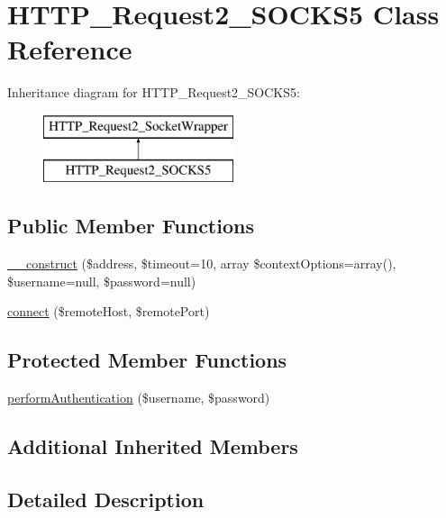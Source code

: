 \hypertarget{classHTTP__Request2__SOCKS5}{}\section{H\+T\+T\+P\+\_\+\+Request2\+\_\+\+S\+O\+C\+K\+S5 Class Reference}
\label{classHTTP__Request2__SOCKS5}
Inheritance diagram for H\+T\+T\+P\+\_\+\+Request2\+\_\+\+S\+O\+C\+K\+S5\+:\begin{figure}[H]
\begin{center}
\leavevmode
\includegraphics[height=2.000000cm]{classHTTP__Request2__SOCKS5}
\end{center}
\end{figure}
\subsection*{Public Member Functions}
\begin{DoxyCompactItemize}
\item 
\hyperlink{classHTTP__Request2__SOCKS5_a5d609d207d0fe50e541200736ad356f0}{\+\_\+\+\_\+construct} (\$address, \$timeout=10, array \$context\+Options=array(), \$username=null, \$password=null)
\item 
\hyperlink{classHTTP__Request2__SOCKS5_ace8abd1469bf004bc8b0f9edc9915d59}{connect} (\$remote\+Host, \$remote\+Port)
\end{DoxyCompactItemize}
\subsection*{Protected Member Functions}
\begin{DoxyCompactItemize}
\item 
\hyperlink{classHTTP__Request2__SOCKS5_ad01bee6f8681e480282bd055468c1dde}{perform\+Authentication} (\$username, \$password)
\end{DoxyCompactItemize}
\subsection*{Additional Inherited Members}


\subsection{Detailed Description}


